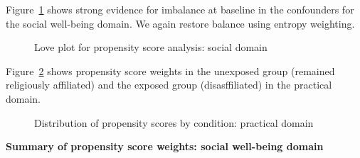 \documentclass[
  singlecolumn,
  9pt]{article}
\begin{document}
Figure~\ref{fig-love-social} shows strong evidence for imbalance at
baseline in the confounders for the social well-being domain. We again
restore balance using entropy weighting.

\begin{figure}


\caption{\label{fig-love-social}Love plot for propensity score analysis:
social domain}

\end{figure}%

Figure~\ref{fig-propensity-dis-social} shows propensity score weights in
the unexposed group (remained religiously affiliated) and the exposed
group (disasffiliated) in the practical domain.

\begin{figure}


\caption{\label{fig-propensity-dis-social}Distribution of propensity
scores by condition: practical domain}

\end{figure}%

\textbf{Summary of propensity score weights: social well-being domain}
\end{document}
